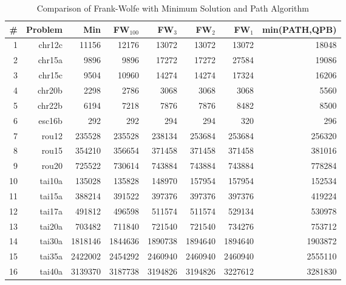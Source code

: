 \begin{table}[h!]
\caption{Comparison of Frank-Wolfe with Minimum Solution and Path Algorithm}
\begin{center}
\begin{tabular}{|r|r|r||r|r|r|r|r|}
\hline
\# & Problem  &   Min    & FW$_{100}$&FW$_{3}$&FW$_{2}$&FW$_{1}$& min(PATH,QPB)\\
\hline
1&    chr12c &   11156 &   12176 &   13072 &   13072 &   13072 &   18048\\
2&    chr15a &    9896 &    9896 &   17272 &   17272 &   27584 &   19086\\
3&    chr15c &    9504 &   10960 &   14274 &   14274 &   17324 &   16206\\
4&   chr20b &    2298 &    2786 &    3068 &    3068 &    3068 &    5560\\
5&    chr22b &    6194 &    7218 &    7876 &    7876 &    8482 &    8500\\
6&    esc16b &     292 &     292 &     294 &     294 &     320 &     296\\
7&     rou12 &  235528 &  235528 &  238134 &  253684 &  253684 &  256320\\
8&     rou15 &  354210 &  356654 &  371458 &  371458 &  371458 &  381016\\
9&     rou20 &  725522 &  730614 &  743884 &  743884 &  743884 &  778284\\
10&    tai10a &  135028 &  135828 &  148970 &  157954 &  157954 &  152534\\
11&    tai15a &  388214 &  391522 &  397376 &  397376 &  397376 &  419224\\
12&    tai17a &  491812 &  496598 &  511574 &  511574 &  529134 &  530978\\
13&    tai20a &  703482 &  711840 &  721540 &  721540 &  734276 &  753712\\
14&    tai30a & 1818146 & 1844636 & 1890738 & 1894640 & 1894640 & 1903872\\
15&    tai35a & 2422002 & 2454292 & 2460940 & 2460940 & 2460940 & 2555110\\
16&    tai40a & 3139370 & 3187738 & 3194826 & 3194826 & 3227612 & 3281830\\
    \hline
\end{tabular}
\end{center}
\label{tab:fwpath}
\end{table}%

